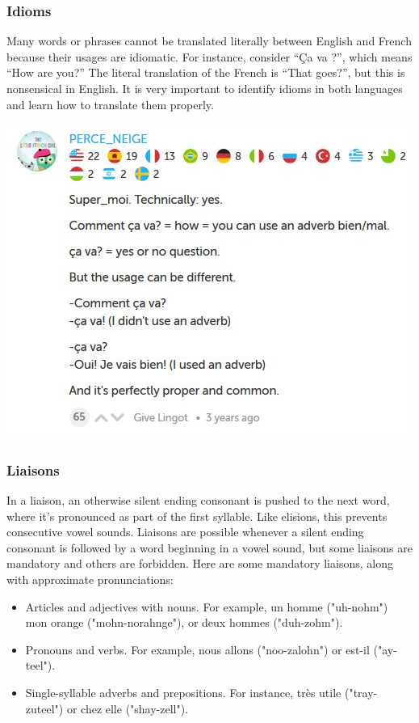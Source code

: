 \subsubsection{Idioms}

Many words or phrases cannot be translated literally between English and French because their usages are idiomatic. For instance, consider ``Ça va ?'', which means ``How are you?'' The literal translation of the French is ``That goes?'', but this is nonsensical in English. It is very important to identify idioms in both languages and learn how to translate them properly.

\begin{center}
  \includegraphics[scale = 0.5]{images/cava.jpg}
\end{center}

\subsubsection{Liaisons}

In a liaison, an otherwise silent ending consonant is pushed to the next word, where it's pronounced as part of the first syllable. Like elisions, this prevents consecutive vowel sounds. Liaisons are possible whenever a silent ending consonant is followed by a word beginning in a vowel sound, but some liaisons are mandatory and others are forbidden.  Here are some mandatory liaisons, along with approximate pronunciations:

\begin{itemize}
  \item  Articles and adjectives with nouns. For example, un homme ("uh-nohm") \\ mon orange ("mohn-norahnge"), or deux hommes ("duh-zohm").
  \item  Pronouns and verbs. For example, nous allons ("noo-zalohn") or est-il ("ay-teel").
  \item  Single-syllable adverbs and prepositions. For instance, très utile ("tray-zuteel") or chez elle ("shay-zell").
\end{itemize}

